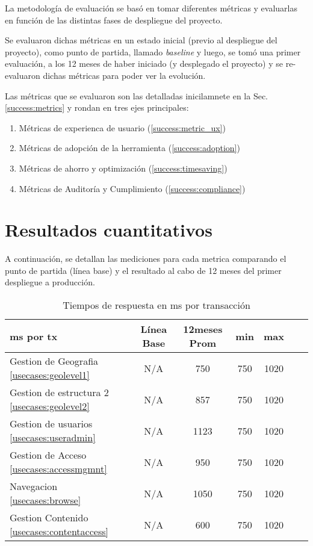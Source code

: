 La metodología de evaluación se basó en tomar diferentes métricas y evaluarlas en función de las distintas fases de despliegue del proyecto.

Se evaluaron dichas métricas en un estado inicial (previo al despliegue del proyecto), como punto de partida, llamado \emph{baseline} y luego, se tomó una primer evaluación, a los 12 meses de haber iniciado (y desplegado el proyecto) y se re-evaluaron dichas métricas para poder ver la evolución.

Las métricas que se evaluaron son las detalladas inicilamnete en la Sec.\ref{success:metrics} y rondan en tres ejes principales:

\begin{enumerate}
    \item Métricas de experienca de usuario (\ref{success:metric_ux})
    \item Métricas de adopción de la herramienta (\ref{success:adoption}) 
    \item Métricas de ahorro y optimización (\ref{success:timesaving})
    \item Métricas de Auditoría y Cumplimiento (\ref{success:compliance})
\end{enumerate}

\section{Resultados cuantitativos}

A continuación, se detallan las mediciones para cada metrica comparando el punto de partida (línea base) y el resultado al cabo de 12 meses del primer despliegue a producción.

\begin{table}[h!]
    \centering
    \begin{tabular}{lcccccc}
        \hline
        \textbf{ms por tx} & \textbf{Línea Base} & \textbf{12meses Prom} & \textbf{min} & \textbf{max} \\ \hline
        Gestion de Geografia \ref{usecases:geolevel1}& N/A & 750 & 750 & 1020\\ \hline
        Gestion de estructura 2 \ref{usecases:geolevel2}& N/A & 857 & 750 & 1020\\ \hline
        Gestion de usuarios \ref{usecases:useradmin}& N/A & 1123 & 750 & 1020\\ \hline
        Gestion de Acceso \ref{usecases:accessmgmnt} & N/A & 950 & 750 & 1020\\ \hline
        Navegacion \ref{usecases:browse}& N/A & 1050 & 750 & 1020\\ \hline
        Gestion Contenido \ref{usecases:contentaccess}& N/A & 600 & 750 & 1020\\ \hline
    \end{tabular}
    \caption{Tiempos de respuesta en ms por transacción}
    \label{tab:tiempo_respuesta}
\end{table}


